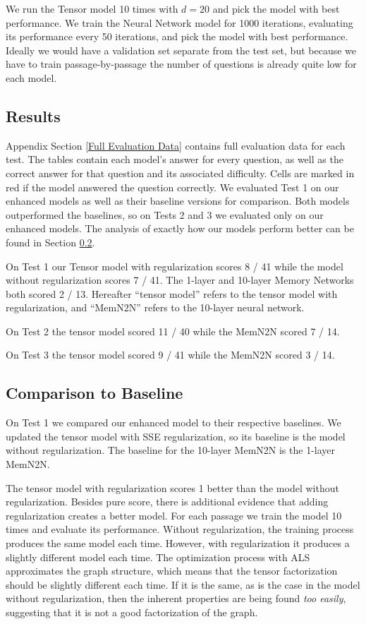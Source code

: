 \documentclass[pageno]{final_paper}
\begin{document}
We run the Tensor model 10 times with $d=20$ and pick the model with best
performance. We train the Neural Network model for 1000 iterations, evaluating
its performance every 50 iterations, and pick the model with best performance.
Ideally we would have a validation set separate from the test set, but because
we have to train passage-by-passage the number of questions is already quite low
for each model.

\subsection{Results}
\label{Results}

Appendix Section \ref{Full Evaluation Data} contains full evaluation data for
each test. The tables contain each model's answer for every question, as well as
the correct answer for that question and its associated difficulty. Cells are
marked in red if the model answered the question correctly. We evaluated Test 1
on our enhanced models as well as their baseline versions for comparison. Both
models outperformed the baselines, so on Tests 2 and 3 we evaluated only on our
enhanced models. The analysis of exactly how our models perform better can be
found in Section \ref{Comparison to Baseline}.

On Test 1 our Tensor model with regularization scores 8 / 41 while the model
without regularization scores 7 / 41. The 1-layer and 10-layer Memory Networks
both scored 2 / 13. Hereafter ``tensor model'' refers to the tensor model with
regularization, and ``MemN2N'' refers to the 10-layer neural network.

On Test 2 the tensor model scored 11 / 40 while the MemN2N scored 7 / 14.

On Test 3 the tensor model scored 9 / 41 while the MemN2N scored 3 / 14.

\subsection{Comparison to Baseline}
\label{Comparison to Baseline}

On Test 1 we compared our enhanced model to their respective baselines. We
updated the tensor model with SSE regularization, so its baseline is the model
without regularization. The baseline for the 10-layer MemN2N is the 1-layer
MemN2N.

The tensor model with regularization scores 1 better than the model without
regularization. Besides pure score, there is additional evidence that adding
regularization creates a better model. For each passage we train the model 10
times and evaluate its performance. Without regularization, the training process
produces the same model each time. However, with regularization it produces a
slightly different model each time. The optimization process with ALS
approximates the graph structure, which means that the tensor factorization
should be slightly different each time. If it is the same, as is the case in the
model without regularization, then the inherent properties are being found
\textit{too easily}, suggesting that it is not a good factorization of the
graph.
\end{document}
